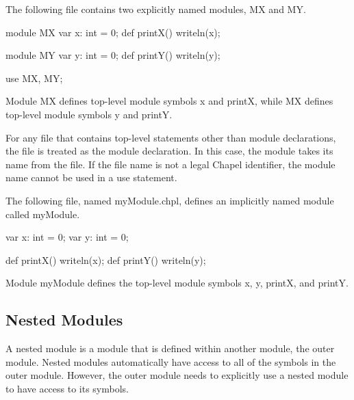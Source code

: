 \begin{example}
The following file contains two explicitly named modules, MX and MY.
\begin{chapelpre}
\end{chapelpre}
\begin{chapel}
module MX {
  var x: int = 0;
  def printX() {
    writeln(x);
  }
}

module MY {
  var y: int = 0;
  def printY() {
    writeln(y);
  }
}
\end{chapel}
\begin{chapelpost}
use MX, MY;
\end{chapelpost}
\begin{chapeloutput}
\end{chapeloutput}
Module MX defines top-level module symbols x and printX, while MX
defines top-level module symbols y and printY.
\end{example}

For any file that contains top-level statements other than module
declarations, the file is treated as the module declaration.  In this
case, the module takes its name from the file.  If the file name is
not a legal Chapel identifier, the module name cannot be used in a use
statement.

\begin{example}
The following file, named myModule.chpl, defines an implicitly named
module called myModule.
\begin{chapelpre}
\end{chapelpre}
\begin{chapel}
var x: int = 0;
var y: int = 0;

def printX() {
  writeln(x);
}
def printY() {
  writeln(y);
}
\end{chapel}
\begin{chapeloutput}
\end{chapeloutput}
Module myModule defines the top-level module symbols x, y, printX, and
printY.
\end{example}


\subsection{Nested Modules}
\label{Nested_Modules}

A nested module is a module that is defined within another module, the
outer module.  Nested modules automatically have access to all of the
symbols in the outer module.  However, the outer module needs to
explicitly use a nested module to have access to its symbols.

